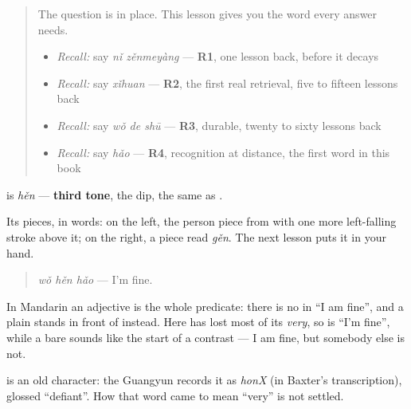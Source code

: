 \label{lesson:ZH-C30-hen}



\begin{quote}
The question is in place. This lesson gives you the word every answer needs.

\begin{itemize}
\raggedright
  \item \emph{Recall:} say \emph{nǐ zěnmeyàng} — \textbf{R1}, one lesson back, before it decays
  \item \emph{Recall:} say \emph{xǐhuan} — \textbf{R2}, the first real retrieval, five to fifteen lessons back
  \item \emph{Recall:} say \emph{wǒ de shū} — \textbf{R3}, durable, twenty to sixty lessons back
  \item \emph{Recall:} say \emph{hǎo} — \textbf{R4}, recognition at distance, the first word in this book
\end{itemize}
\end{quote}

\begin{sounds}
\textbf{} is \emph{hěn} — \textbf{third tone}, the dip, the same as .

Its pieces, in words: on the left, the person piece from  with one more left-falling stroke above it; on the right, a piece read \emph{gěn}. The next lesson puts it in your hand.
\end{sounds}

\begin{grammarlens}[title={Grammar Lens: no \zh{是}, and a plain \zh{很} instead}]
\begin{quote}
\textbf{} \emph{wǒ hěn hǎo} — I'm fine.
\end{quote}

In Mandarin an adjective is the whole predicate: there is no  in \textquotedblleft{}I am fine\textquotedblright{}, and a plain  stands in front of  instead. Here  has lost most of its \emph{very}, so  is \textquotedblleft{}I'm fine\textquotedblright{}, while a bare  sounds like the start of a contrast — I am fine, but somebody else is not.
\end{grammarlens}

\begin{cousinweb}
\textbf{} is an old character: the Guangyun records it as \emph{honX} (in Baxter's transcription), glossed \textquotedblleft{}defiant\textquotedblright{}. How that word came to mean \textquotedblleft{}very\textquotedblright{} is not settled.
\end{cousinweb}

